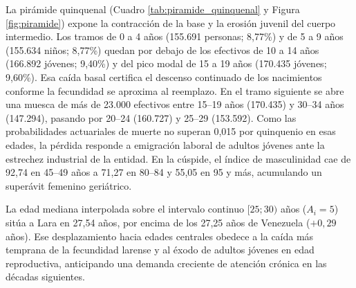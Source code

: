 \documentclass[12pt,letterpaper]{article}
\begin{document}
La pirámide quinquenal (Cuadro \ref{tab:piramide_quinquenal} y Figura \ref{fig:piramide}) expone la contracción de la base y la erosión juvenil del cuerpo intermedio. Los tramos de 0 a 4 años (155.691 personas; 8,77\%) y de 5 a 9 años (155.634 niños; 8,77\%) quedan por debajo de los efectivos de 10 a 14 años (166.892 jóvenes; 9,40\%) y del pico modal de 15 a 19 años (170.435 jóvenes; 9,60\%). Esa caída basal certifica el descenso continuado de los nacimientos conforme la fecundidad se aproxima al reemplazo. En el tramo siguiente se abre una muesca de más de 23.000 efectivos entre 15--19 años (170.435) y 30--34 años (147.294), pasando por 20--24 (160.727) y 25--29 (153.592). Como las probabilidades actuariales de muerte no superan 0,015 por quinquenio en esas edades, la pérdida responde a emigración laboral de adultos jóvenes ante la estrechez industrial de la entidad. En la cúspide, el índice de masculinidad cae de 92,74 en 45--49 años a 71,27 en 80--84 y 55,05 en 95 y más, acumulando un superávit femenino geriátrico.

La edad mediana interpolada sobre el intervalo continuo $[25; 30)$ años ($A_i = 5$) sitúa a Lara en 27,54 años, por encima de los 27,25 años de Venezuela ($+0,29$ años). Ese desplazamiento hacia edades centrales obedece a la caída más temprana de la fecundidad larense y al éxodo de adultos jóvenes en edad reproductiva, anticipando una demanda creciente de atención crónica en las décadas siguientes.
\end{document}
